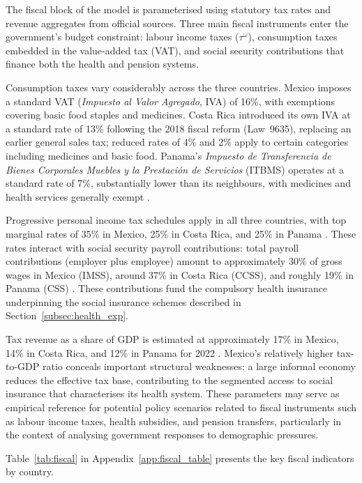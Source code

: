 \documentclass[12pt,a4paper]{article}
\begin{document}
The fiscal block of the model is parameterised using statutory tax
rates and revenue aggregates from official sources. Three main fiscal
instruments enter the government's budget constraint: labour income
taxes ($\tau^{\omega}$), consumption taxes embedded in the value-added
tax (VAT), and social security contributions that finance both the
health and pension systems.

Consumption taxes vary considerably across the three countries. Mexico
imposes a standard VAT (\textit{Impuesto al Valor Agregado}, IVA) of
16\%, with exemptions covering basic food staples and medicines. Costa
Rica introduced its own IVA at a standard rate of 13\% following the
2018 fiscal reform (Law~9635), replacing an earlier general sales tax;
reduced rates of 4\% and 2\% apply to certain categories including
medicines and basic food. Panama's \textit{Impuesto de Transferencia de
Bienes Corporales Muebles y la Prestaci\'{o}n de Servicios} (ITBMS)
operates at a standard rate of 7\%, substantially lower than its
neighbours, with medicines and health services generally exempt
\citep{PwCWWTS2024}.

Progressive personal income tax schedules apply in all three countries,
with top marginal rates of 35\% in Mexico, 25\% in Costa Rica, and
25\% in Panama \citep{PwCWWTS2024}. These rates interact with social
security payroll contributions: total payroll contributions (employer
plus employee) amount to approximately 30\% of gross wages in Mexico
(IMSS), around 37\% in Costa Rica (CCSS), and roughly 19\% in Panama
(CSS) \citep{CCSS2023, PwCWWTS2024}. These contributions fund the
compulsory health insurance underpinning the social insurance schemes
described in Section~\ref{subsec:health_exp}.

Tax revenue as a share of GDP is estimated at approximately 17\% in
Mexico, 14\% in Costa Rica, and 12\% in Panama for 2022
\citep{OECDRevStats2024, WorldBankWDI2024}. Mexico's relatively higher
tax-to-GDP ratio conceals important structural weaknesses: a large
informal economy reduces the effective tax base, contributing to the
segmented access to social insurance that characterises its health
system. These parameters may serve as empirical reference for potential policy scenarios related to fiscal instruments such as labour income taxes, health subsidies, and pension transfers, particularly in the context of analysing government responses to demographic pressures.

Table~\ref{tab:fiscal} in Appendix~\ref{app:fiscal_table} presents the key fiscal indicators by country.
\end{document}
